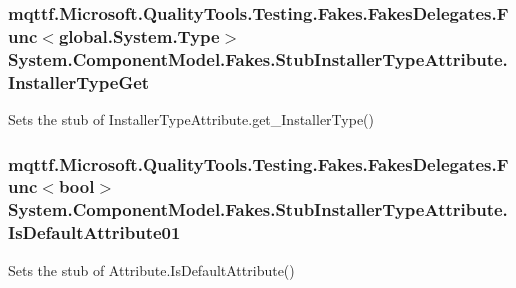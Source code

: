 \hypertarget{class_system_1_1_component_model_1_1_fakes_1_1_stub_installer_type_attribute_af4cac39fc2c2d82d09d9a116c6b4c92e}{
\subsubsection[{Installer\-Type\-Get}]{\setlength{\rightskip}{0pt plus 5cm}mqttf.\-Microsoft.\-Quality\-Tools.\-Testing.\-Fakes.\-Fakes\-Delegates.\-Func$<$global.\-System.\-Type$>$ System.\-Component\-Model.\-Fakes.\-Stub\-Installer\-Type\-Attribute.\-Installer\-Type\-Get}}\label{class_system_1_1_component_model_1_1_fakes_1_1_stub_installer_type_attribute_af4cac39fc2c2d82d09d9a116c6b4c92e}


Sets the stub of Installer\-Type\-Attribute.\-get\-\_\-\-Installer\-Type()

\hypertarget{class_system_1_1_component_model_1_1_fakes_1_1_stub_installer_type_attribute_a80f0f055abcd82328f7a0fcb863b61c7}{
\subsubsection[{Is\-Default\-Attribute01}]{\setlength{\rightskip}{0pt plus 5cm}mqttf.\-Microsoft.\-Quality\-Tools.\-Testing.\-Fakes.\-Fakes\-Delegates.\-Func$<$bool$>$ System.\-Component\-Model.\-Fakes.\-Stub\-Installer\-Type\-Attribute.\-Is\-Default\-Attribute01}}\label{class_system_1_1_component_model_1_1_fakes_1_1_stub_installer_type_attribute_a80f0f055abcd82328f7a0fcb863b61c7}


Sets the stub of Attribute.\-Is\-Default\-Attribute()

